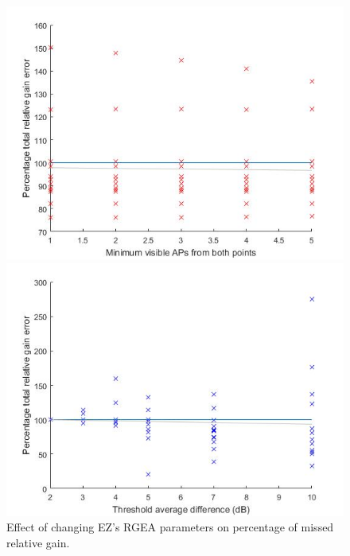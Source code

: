 \documentclass{UoYCSproject}
\begin{document}
                \begin{figure}[h]
                    \label{fig:ez_comp}
                    \centering
                    \begin{minipage}{0.5\textwidth}
                        \centering
                        \includegraphics[width=1\textwidth]{ez_overlap.jpg}
                    \end{minipage}\hfill
                    \begin{minipage}{0.5\textwidth}
                        \centering
                        \includegraphics[width=1\textwidth]{ez_prox.jpg}
                    \end{minipage}
                    \caption{Effect of changing EZ's RGEA parameters on percentage of missed relative gain.}
                \end{figure}
                
\end{document}
